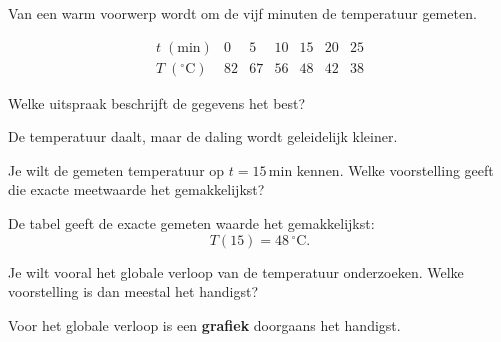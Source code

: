 \documentclass{ximera}
\begin{document}

\begin{oefening}{\oefB \ESS}

Van een warm voorwerp wordt om de vijf minuten de temperatuur gemeten.

\[
\begin{array}{c|cccccc}
t\;(\mathrm{min})
&0&5&10&15&20&25\\ \hline
T\;({}^{\circ}\mathrm C)
&82&67&56&48&42&38
\end{array}
\]

\begin{question}
Welke uitspraak beschrijft de gegevens het best?

\begin{multipleChoice}
\end{multipleChoice}


\begin{oplossing}
De temperatuur daalt, maar de daling wordt geleidelijk kleiner.
\end{oplossing}

\end{question}

\begin{question}
Je wilt de gemeten temperatuur op $t=15\,\mathrm{min}$ kennen.
Welke voorstelling geeft die exacte meetwaarde het gemakkelijkst?

\begin{multipleChoice}
\end{multipleChoice}


\begin{oplossing}
De tabel geeft de exacte gemeten waarde het gemakkelijkst:
\[
T(15)=48\,{}^\circ\mathrm C.
\]
\end{oplossing}

\end{question}

\begin{question}
Je wilt vooral het globale verloop van de temperatuur onderzoeken.
Welke voorstelling is dan meestal het handigst?

\begin{multipleChoice}
\end{multipleChoice}


\begin{oplossing}
Voor het globale verloop is een \textbf{grafiek} doorgaans het handigst.
\end{oplossing}

\end{question}

\end{oefening}
\end{document}
